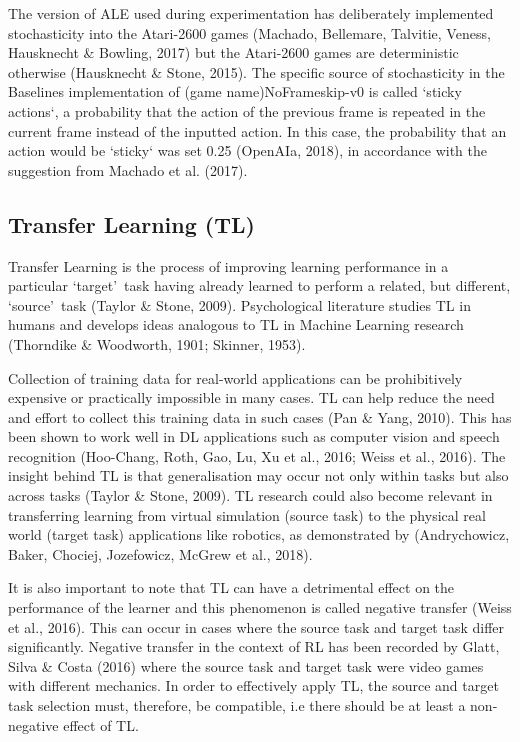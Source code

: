 The version of ALE used during experimentation has deliberately implemented stochasticity into the Atari-2600 games (Machado, Bellemare, Talvitie, Veness, Hausknecht \& Bowling, 2017) but the Atari-2600 games are deterministic otherwise (Hausknecht \& Stone, 2015). The specific source of stochasticity in the Baselines implementation of (game name)NoFrameskip-v0 is called `sticky actions`, a probability that the action of the previous frame is repeated in the current frame instead of the inputted action. In this case, the probability that an action would be `sticky` was set 0.25 (OpenAIa, 2018), in accordance with the suggestion from Machado et al. (2017).

\subsection*{Transfer Learning (TL)}
Transfer Learning is the process of improving learning performance in a particular \lq target\rq \ task having already learned to perform a related, but different, \lq source\rq \ task (Taylor \& Stone, 2009). Psychological literature studies TL in humans and develops ideas analogous to TL in Machine Learning research (Thorndike \& Woodworth, 1901; Skinner, 1953).

Collection of training data for real-world applications can be prohibitively expensive or practically impossible in many cases. TL can help reduce the need and effort to collect this training data in such cases (Pan \& Yang, 2010). This has been shown to work well in DL applications such as computer vision and speech recognition (Hoo-Chang, Roth, Gao, Lu, Xu et al., 2016; Weiss et al., 2016). The insight behind TL is that generalisation may occur not only within tasks but also across tasks (Taylor \& Stone, 2009). TL research could also become relevant in transferring learning from virtual simulation (source task) to the physical real world (target task) applications like robotics, as demonstrated by (Andrychowicz, Baker, Chociej, Jozefowicz, McGrew et al., 2018). 

It is also important to note that TL can have a detrimental effect on the performance of the learner and this phenomenon is called negative transfer (Weiss et al., 2016). This can occur in cases where the source task and target task differ significantly. Negative transfer in the context of RL has been recorded by Glatt, Silva \& Costa (2016) where the source task and target task were video games with different mechanics. In order to effectively apply TL, the source and target task selection must, therefore, be compatible, i.e there should be at least a non-negative effect of TL. 

